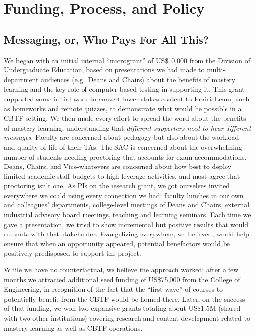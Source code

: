 \section{Funding, Process, and Policy}
\label{sec:policy}

\subsection{Messaging, or, Who Pays For All This?}


We began with an initial internal ``microgrant'' of US\$10,000 from the
Division of Undergraduate Education, based on presentations we had
made to multi-department audiences (e.g.\ Deans and Chairs) about the
benefits of mastery learning and the key role of computer-based
testing in supporting it.  This grant supported some initial work
to convert lower-stakes content to PrairieLearn, such as homeworks
and remote quizzes,
to demonstrate what would be
possible in a CBTF setting.
We then made every effort to spread the word about the benefits of mastery
learning, understanding that \emph{different supporters need to hear
different messages.\/}  Faculty are concerned about pedagogy but also
about the workload and quality-of-life of their TAs.  The SAC is
concerned about the overwhelming number of students needing proctoring
that accounts for exam accommodations.  Deans,
Chairs, and Vice-whatevers are concerned about how best to deploy
limited academic staff budgets to high-leverage activities, and most
agree that proctoring isn't one.
As PIs on the research grant, we got ourselves invited everywhere we could using every connection we
had: faculty lunches in our
own and colleagues' departments, college-level meetings of Deans and Chairs,
external industrial advisory board meetings, teaching and learning seminars.
Each time we gave a presentation, we tried to show incremental but
positive results that would resonate with that stakeholder.
Evangelizing everywhere, we believed, would help ensure that when
an opportunity appeared,  potential benefactors would be positively
predisposed to support the project.

While we have no counterfactual, we believe the approach worked:
after a few months we attracted additional
seed funding of US\$75,000 from the College of Engineering, in
recognition of the fact that the ``first wave'' of courses to
potentially benefit from the CBTF would be homed there.
Later, on the success of that funding, we won two expansive grants
totaling about US\$1.5M (shared with two 
other institutions) covering research and content development related
to mastery learning as well as CBTF operations.

